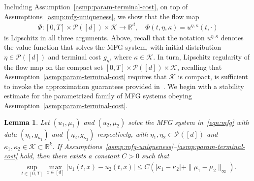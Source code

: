 \documentclass[11pt,reqno]{amsart}
\numberwithin{equation}{section}
\theoremstyle{plain}
\newtheorem{lemma}{Lemma}[section]
\newcommand{\R}{\mathbb{R}}
\newcommand{\calK}{{\mathcal K}}
\newcommand{\calP}{{\mathcal P}}
\newcommand{\1}{\boldsymbol{\mathbbm{1}}}
\begin{document}
Including Assumption~\ref{asmp:param-terminal-cost}, on top of Assumptions~\ref{asmp:mfg-uniqueness}, we show that the flow map \begin{align*}
    \Phi : [0, T] \times \calP([d]) \times \calK \to \R^d, \quad \Phi(t, \eta, \kappa) = u^{\eta, \kappa}(t, \cdot)
\end{align*}
is Lipschitz in all three arguments. Above, recall that the notation $u^{\eta, \kappa}$ denotes the value function that solves the MFG system, with initial distribution $\eta \in \calP([d])$ and terminal cost $g_\kappa$, where $\kappa \in \calK$. In turn, Lipschitz regularity of the flow map on the compact set $[0, T] \times \calP([d]) \times \calK$, recalling that Assumption~\ref{asmp:param-terminal-cost} requires that $\calK$ is compact, is sufficient to invoke the approximation guarantees provided in~\cite{Jiao2023}. We begin with a stability estimate for the parametrized family of MFG systems obeying Assumption~\ref{asmp:param-terminal-cost}.
\begin{lemma}
\label{lem:u-stability-term-condition}
Let $(u_1, \mu_1)$ and $(u_2, \mu_2)$ solve the MFG system in~\eqref{eqn:mfg} with data $(\eta_1, g_{\kappa_1})$ and $(\eta_2, g_{\kappa_2})$ respectively, with $\eta_1, \eta_2 \in \calP([d])$ and $\kappa_1, \kappa_2 \in \calK \subset \R^k$. If Assumptions~\ref{asmp:mfg-uniqueness}--\ref{asmp:param-terminal-cost} hold, then there exists a constant $C > 0$ such that
\begin{align}
    \sup_{t \in [0, T]} \max_{x \in [d]}|u_1(t, x) - u_2(t, x)| \leq C (|\kappa_1 - \kappa_2| + \|\mu_1 - \mu_2\|_\infty).
\end{align}
\end{lemma}
\end{document}
